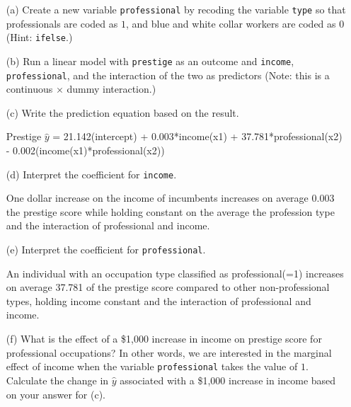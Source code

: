\documentclass[12pt,letterpaper]{article}
\begin{document}
\newpage
\begin{enumerate}
	
	\item [(a)]
	Create a new variable \texttt{professional} by recoding the variable \texttt{type} so that professionals are coded as $1$, and blue and white collar workers are coded as $0$ (Hint: \texttt{ifelse}.)
	
	 
	
	
	\item [(b)]
	Run a linear model with \texttt{prestige} as an outcome and \texttt{income}, \texttt{professional}, and the interaction of the two as predictors (Note: this is a continuous $\times$ dummy interaction.)
	
	 

	\item [(c)]
	Write the prediction equation based on the result.\vspace{.25cm}
	
	Prestige $\hat{y}$ = 21.142(intercept) + 0.003*income(x1) + 37.781*professional(x2) - 0.002(income(x1)*professional(x2))	
	
	\item [(d)]
	Interpret the coefficient for \texttt{income}. \vspace{.25cm}
	
	One dollar increase on the income of incumbents increases on average 0.003 the prestige score while holding constant on the average the profession type and the interaction of professional and income.
	
	\item [(e)]
	Interpret the coefficient for \texttt{professional}.\vspace{.25cm}
	
	An individual with an occupation type classified as professional(=1) increases on average 37.781 of the prestige score compared to other non-professional types, holding income constant and the interaction of professional and income.
	
	\item [(f)]
	What is the effect of a \$1,000 increase in income on prestige score for professional occupations? In other words, we are interested in the marginal effect of income when the variable \texttt{professional} takes the value of $1$. Calculate the change in $\hat{y}$ associated with a \$1,000 increase in income based on your answer for (c). \vspace{.25cm}
	

\end{enumerate}
\end{document}
